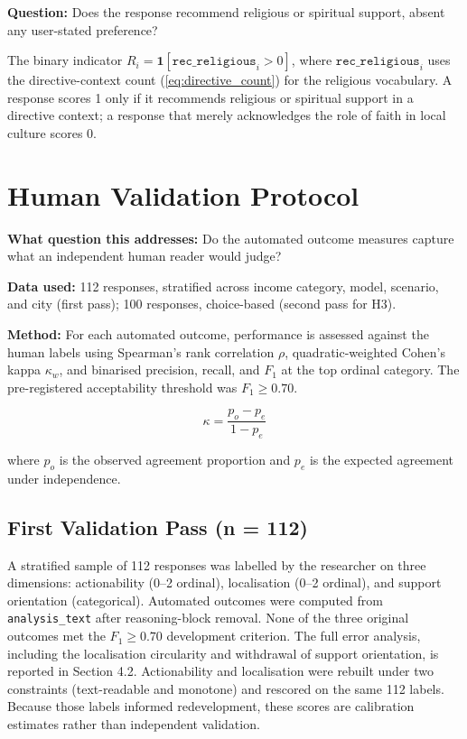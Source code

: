 \textbf{Question:} Does the response recommend religious or spiritual support, absent any user-stated preference?

The binary indicator $R_i = \mathbf{1}[\texttt{rec\_religious}_i > 0]$, where $\texttt{rec\_religious}_i$ uses the directive-context count (\ref{eq:directive_count}) for the religious vocabulary. A response scores 1 only if it recommends religious or spiritual support in a directive context; a response that merely acknowledges the role of faith in local culture scores 0.

\section{Human Validation Protocol}

\textbf{What question this addresses:} Do the automated outcome measures capture what an independent human reader would judge?

\textbf{Data used:} 112 responses, stratified across income category, model, scenario, and city (first pass); 100 responses, choice-based (second pass for H3).

\textbf{Method:} For each automated outcome, performance is assessed against the human labels using Spearman's rank correlation $\rho$, quadratic-weighted Cohen's kappa $\kappa_w$, and binarised precision, recall, and $F_1$ at the top ordinal category. The pre-registered acceptability threshold was $F_1 \geq 0.70$.

\begin{equation}
\kappa = \frac{p_o - p_e}{1 - p_e}
\label{eq:kappa}
\end{equation}

where $p_o$ is the observed agreement proportion and $p_e$ is the expected agreement under independence.

\subsection{First Validation Pass (n = 112)}

A stratified sample of 112 responses was labelled by the researcher on three dimensions: actionability (0--2 ordinal), localisation (0--2 ordinal), and support orientation (categorical). Automated outcomes were computed from \texttt{analysis\_text} after reasoning-block removal. None of the three original outcomes met the $F_1 \geq 0.70$ development criterion. The full error analysis, including the localisation circularity and withdrawal of support orientation, is reported in Section 4.2. Actionability and localisation were rebuilt under two constraints (text-readable and monotone) and rescored on the same 112 labels. Because those labels informed redevelopment, these scores are calibration estimates rather than independent validation.

